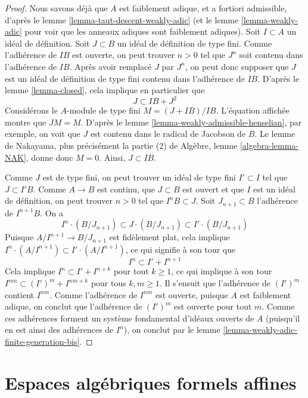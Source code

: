 \begin{proof}
Nous savons déjà que $A$ est faiblement adique, et a fortiori admissible, d'après
le lemme \ref{lemma-taut-descent-weakly-adic}
(et le lemme \ref{lemma-weakly-adic} pour voir que les anneaux adiques sont faiblement adiques).
Soit $I \subset A$ un idéal de définition.
Soit $J \subset B$ un idéal de définition de type fini.
Comme l'adhérence de $IB$ est ouverte, on peut trouver $n > 0$ tel que
$J^n$ soit contenu dans l'adhérence de $IB$. Après avoir remplacé $J$
par $J^n$, on peut donc supposer que $J$ est un idéal de définition
de type fini contenu dans l'adhérence de $IB$. D'après le lemme \ref{lemma-closed},
cela implique en particulier que
$$
J \subset IB + J^2
$$
Considérons le $A$-module de type fini $M = (J + IB)/IB$.
L'équation affichée montre que $JM = M$.
D'après le lemme \ref{lemma-weakly-admissible-henselian}, par exemple,
on voit que $J$ est contenu dans le radical de Jacobson de $B$.
Le lemme de Nakayama, plus précisément la partie (2) de
Algèbre, lemme \ref{algebra-lemma-NAK}, donne donc $M = 0$.
Ainsi, $J \subset IB$.

\medskip\noindent
Comme $J$ est de type fini, on peut trouver un idéal de type fini
$I' \subset I$ tel que $J \subset I'B$.
Comme $A \to B$ est continu, que $J \subset B$ est ouvert et que
$I$ est un idéal de définition, on peut trouver $n > 0$ tel que
$I^nB \subset J$. Soit $J_{n + 1} \subset B$ l'adhérence de
$I^{n + 1}B$.
On a
$$
I^n \cdot (B/J_{n + 1}) \subset J \cdot (B/J_{n + 1}) \subset
I' \cdot (B/J_{n + 1})
$$
Puisque $A/I^{n + 1} \to B/J_{n + 1}$ est fidèlement plat, cela
implique $I^n \cdot (A/I^{n + 1}) \subset I' \cdot (A/I^{n + 1})$,
ce qui signifie à son tour que
$$
I^n \subset I' + I^{n + 1}
$$
Cela implique $I^n \subset I'  + I^{n + k}$ pour tout $k \geq 1$,
ce qui implique à son tour $I^{nm} \subset (I')^m + I^{nm + k}$
pour tous $k, m \geq 1$. Il s'ensuit que l'adhérence de
$(I')^m$ contient $I^{nm}$. Comme l'adhérence de $I^{nm}$ est ouverte,
puisque $A$ est faiblement adique,
on conclut que l'adhérence de $(I')^m$ est ouverte pour tout $m$.
Comme ces adhérences forment un système fondamental d'idéaux ouverts
de $A$ (puisqu'il en est ainsi des adhérences de $I^n$),
on conclut par le lemme \ref{lemma-weakly-adic-finite-generation-bis}.
\end{proof}









\section{Espaces algébriques formels affines}
\label{section-affine-formal-algebraic-spaces}

